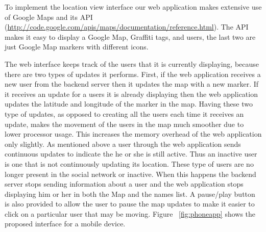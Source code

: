 \documentclass[11pt]{article}
\begin{document}
To implement the location view interface our web
application makes extensive use of Google Maps and its API
(\url{http://code.google.com/apis/maps/documentation/reference.html}).
The API makes it easy to display a Google Map, Graffiti tags, and users,
the last two are just Google Map markers with different icons.

The web interface keeps track of the users that it is currently
displaying, because there are two types of updates it performs. First,
if the web application receives a new user from the  backend server
then it updates the map with a new marker. If it receives an update for
a users it is already displaying then the web application updates the
latitude and longitude of the marker in the map. Having these two type
of updates, as opposed to creating all the users each time it receives
an update, makes the movement of the users in the map much smoother due
to lower processor usage. This increases the memory overhead of the web
application only slightly. As mentioned above a user through the web
application sends continuous updates to indicate the he or she is still
active. Thus an inactive user is one that is not continuously updating
its location. These type of users are no longer present in the social
network or inactive. When this happens the backend server stops sending
information about a user and the web application stops displaying him
or her in both the Map and the names list. A pause/play button is also
provided to allow the user to pause the map updates to make it easier to
click on a particular user that may be moving. Figure ~\ref{fig:phoneapp}
shows the proposed interface for a mobile device.
\end{document}
